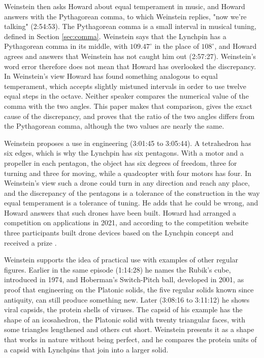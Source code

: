 \documentclass[a4paper,12pt]{article}
\begin{document}
Weinstein then asks Howard about equal temperament in music, and Howard answers with the Pythagorean comma, to which Weinstein replies, "now we're talking" (2:54:53). The Pythagorean comma is a small interval in musical tuning, defined in Section \ref{sec:comma}. Weinstein says that the Lynchpin has a Pythagorean comma in its middle, with \( 109.47^\circ \) in the place of \( 108^\circ \), and Howard agrees and answers that Weinstein has not caught him out (2:57:27). Weinstein's word error therefore does not mean that Howard has overlooked the discrepancy. In Weinstein's view Howard has found something analogous to equal temperament, which accepts slightly mistuned intervals in order to use twelve equal steps in the octave. Neither speaker compares the numerical value of the comma with the two angles. This paper makes that comparison, gives the exact cause of the discrepancy, and proves that the ratio of the two angles differs from the Pythagorean comma, although the two values are nearly the same.

Weinstein proposes a use in engineering (3:01:45 to 3:05:44). A tetrahedron has six edges, which is why the Lynchpin has six pentagons. With a motor and a propeller in each pentagon, the object has six degrees of freedom, three for turning and three for moving, while a quadcopter with four motors has four. In Weinstein's view such a drone could turn in any direction and reach any place, and the discrepancy of the pentagons is a tolerance of the construction in the way equal temperament is a tolerance of tuning. He adds that he could be wrong, and Howard answers that such drones have been built. Howard had arranged a competition on applications in 2021, and according to the competition website three participants built drone devices based on the Lynchpin concept and received a prize \cite{lynchpin-competition}.

Weinstein supports the idea of practical use with examples of other regular figures. Earlier in the same episode (1:14:28) he names the Rubik's cube, introduced in 1974, and Hoberman's Switch-Pitch ball, developed in 2001, as proof that engineering on the Platonic solids, the five regular solids known since antiquity, can still produce something new. Later (3:08:16 to 3:11:12) he shows viral capsids, the protein shells of viruses. The capsid of his example has the shape of an icosahedron, the Platonic solid with twenty triangular faces, with some triangles lengthened and others cut short. Weinstein presents it as a shape that works in nature without being perfect, and he compares the protein units of a capsid with Lynchpins that join into a larger solid.
\end{document}
